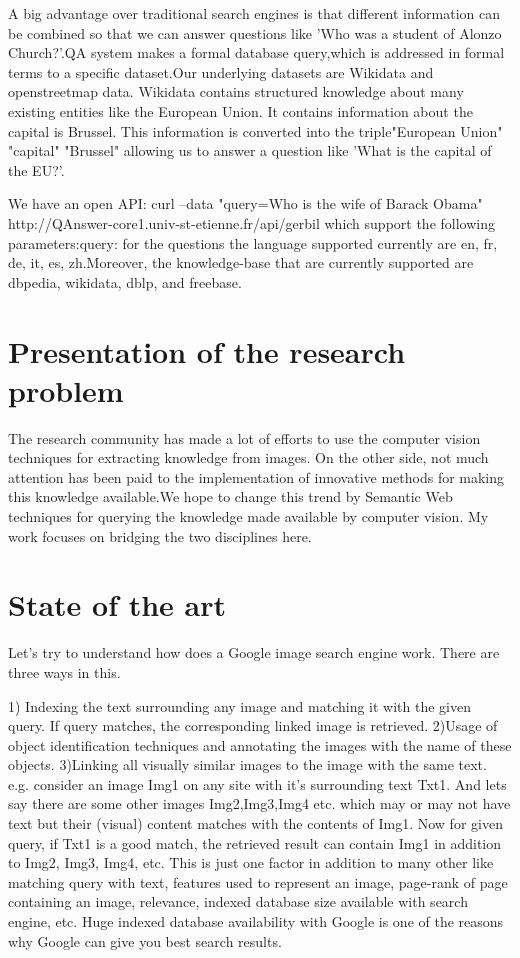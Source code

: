 \documentclass[12pt]{article}
\begin{document}
A big advantage over traditional search engines is that different information can be combined so that we can answer questions like 'Who was a student of Alonzo Church?'.QA system makes a formal database query,which is addressed in formal terms to a specific dataset.Our underlying datasets are Wikidata and openstreetmap data. Wikidata contains structured knowledge about many existing entities like the European Union. It contains information about the capital is Brussel. This information is converted into the triple"European Union" "capital" "Brussel" allowing us to answer a question like 'What is the capital of the EU?'.

We have an open API: curl --data "query=Who is the wife of Barack Obama" http://QAnswer-core1.univ-st-etienne.fr/api/gerbil 
which support the following parameters:query: for the questions the language supported currently are en, fr, de, it, es, zh.Moreover, the knowledge-base that are currently supported are dbpedia, wikidata, dblp, and freebase.\\

\section{Presentation of the research problem}

The research community has made a lot of efforts to use the computer vision techniques for extracting knowledge from images.  On the other side, not much attention has been paid to the implementation of innovative methods for making this knowledge available.We hope to change this trend by Semantic Web techniques for querying the knowledge made available by computer vision. My work focuses on bridging the two disciplines here. 
\section{State of the art}
Let's try to understand how does a Google image search engine work.
There are three ways in this.


1) Indexing the text surrounding any image and matching it with the given query. If query matches, the corresponding linked image is retrieved. 
2)Usage of object identification techniques and annotating the images with the name of these objects.
3)Linking all visually similar images to the image with the same text.
e.g. consider an image Img1 on any site with it's surrounding text Txt1. And lets say there are some other images Img2,Img3,Img4 etc. which may or may not have text but their (visual) content matches with the contents of Img1.
Now for given query, if Txt1 is a good match, the retrieved result can contain Img1 in addition to Img2, Img3, Img4, etc.
This is just one factor in addition to many other like matching query with text, features used to represent an image, page-rank of page containing an image, relevance, indexed database size available with search engine, etc.
Huge indexed database availability with Google is one of the reasons why Google can give you best search results\cite{Quora}.
\end{document}
